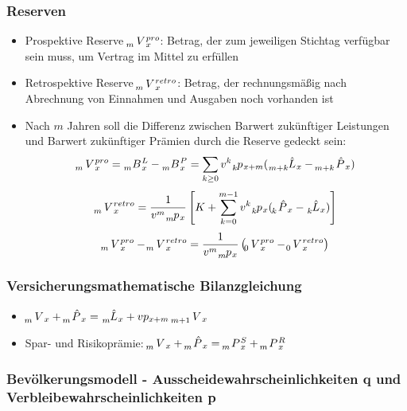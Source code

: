 \documentclass[12pt]{report}
\theoremstyle{dotless}
\theoremstyle{definition}
\begin{document}
\subsubsection{Reserven}
\begin{itemize}
	\item Prospektive Reserve $\tensor[_{m}]{V}{}_x^{pro}$: Betrag, der zum jeweiligen Stichtag verfügbar sein muss, um Vertrag im Mittel zu erfüllen
	\item Retrospektive Reserve $\tensor[_{m}]{V}{}_x^{retro}$: Betrag, der rechnungsmäßig nach Abrechnung von Einnahmen und Ausgaben noch vorhanden ist
	\item Nach $m$ Jahren soll die Differenz zwischen Barwert zukünftiger Leistungen und Barwert zukünftiger Prämien durch die Reserve gedeckt sein: 
	\begin{equation}
		\tensor[_{m}]{V}{}_x^{pro} = \tensor[_{m}]{B}{}_x^{L} - \tensor[_{m}]{B}{}_x^{P} = \sum_{k \geq 0} v^k \tensor[_{k}]{p}{}_{x+m}(\tensor[_{m+k}]{\hat{L}}{}_x - \tensor[_{m+k}]{\hat{P}}{}_x)
	\end{equation}
	\begin{equation}
		\tensor[_{m}]{V}{}_x^{retro} = \frac{1}{v^m \tensor[_{m}]{p}{}_x} \left[K+\sum_{k=0}^{m-1}v^k \tensor[_{k}]{p}{}_x (\tensor[_{k}]{\hat{P}}{}_x - \tensor[_{k}]{\hat{L}}{}_x) \right]
	\end{equation}
	\begin{equation}
		\tensor[_{m}]{V}{}_x^{pro} - \tensor[_{m}]{V}{}_x^{retro} = \frac{1}{v^m \tensor[_{m}]{p}{}_x} \left(\tensor[_{0}]{V}{}_x^{pro} - \tensor[_{0}]{V}{}_x^{retro}\right)
	\end{equation}
\end{itemize}

\subsubsection{Versicherungsmathematische Bilanzgleichung}
\begin{itemize}
	\item $\tensor[_{m}]{V}{}_x + \tensor[_{m}]{\hat{P}}{}_x = \tensor[_{m}]{\hat{L}}{}_x + vp_{x+m} \ \tensor[_{m+1}]{V}{}_x$
	\item Spar- und Risikoprämie: $\tensor[_{m}]{V}{}_x + \tensor[_{m}]{\hat{P}}{}_x = \tensor[_{m}]{P}{}_x^S + \tensor[_{m}]{P}{}_x^R$
\end{itemize}

\newpage
\subsubsection{Bevölkerungsmodell - Ausscheidewahrscheinlichkeiten q und Verbleibewahrscheinlichkeiten p}
\end{document}
